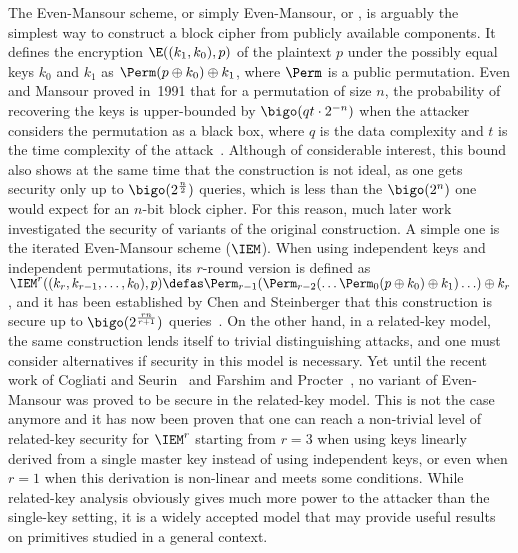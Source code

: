 The Even-Mansour scheme, or simply Even-Mansour, or \EM, is arguably the simplest way to construct a block cipher from publicly available
components. It defines the encryption $\E((k_1, k_0), p)$ of the plaintext $p$ under the possibly equal keys $k_0$
and $k_1$ as $\Perm(p \oplus k_0) \oplus k_1$, where $\Perm$ is a public permutation. Even and Mansour proved
in~1991 that for a permutation of size $n$, the probability of recovering the keys
is upper-bounded by $\bigo(qt \cdot 2^{-n})$ when the attacker considers the permutation as a black box,
where $q$ is the data complexity and $t$ is the time
complexity of the attack~\cite{EM}. Although
of considerable interest, this bound also shows at the same time that the construction is not ideal,
as one gets security only up to $\bigo(2^\frac{n}{2})$ queries, which
is less than the $\bigo(2^n)$ one would expect for an $n$-bit block cipher. For this
reason, much later work investigated the security of variants of the original construction. A simple
one is the iterated Even-Mansour scheme ($\IEM$). When using independent keys and independent permutations,
its $r$-round version is defined as
$\IEM^r((k_r, k_{r-1}, \ldots, k_0), p) \defas \Perm_{r-1}(\Perm_{r-2}(\ldots\Perm_0\linebreak[1](p \oplus k_0) \oplus k_1)\ldots) \oplus k_r$,
and it has been established by Chen and Steinberger that this construction is secure up to $\bigo(2^\frac{rn}{r+1})$ queries~\cite{CS14}.
On the other hand, in a related-key model, the same construction lends itself to trivial
distinguishing attacks, and one must consider alternatives if security in this model is necessary.
Yet until the recent work of Cogliati and Seurin~\cite{CS15} and Farshim and Procter~\cite{FP14},
no variant of Even-Mansour was proved to be secure in the related-key model. This is not the case
anymore and it has now been proven that one can reach a non-trivial level of related-key security for $\IEM^r$
starting from $r = 3$ when using keys linearly derived from a single master key instead
of using independent keys, or even when $r = 1$
when this derivation is non-linear and meets some conditions.
While related-key analysis obviously gives much more power to the attacker than the
single-key setting, it is a widely accepted
model that may provide useful results on primitives studied in a general context.


